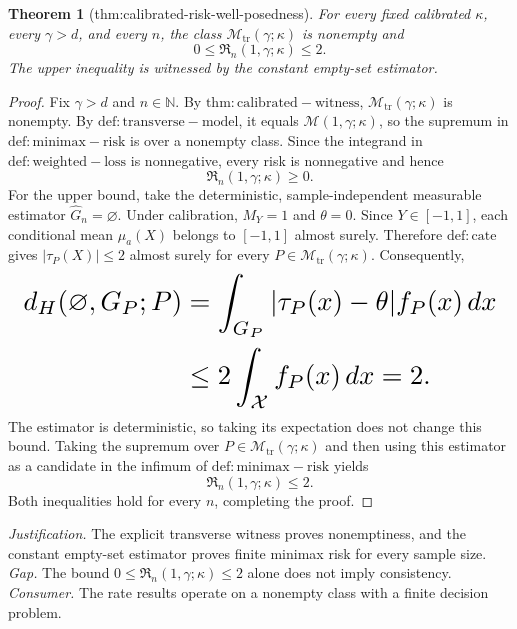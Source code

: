 \documentclass{article}
\newtheorem{theorem}{Theorem}
\begin{document}
\begin{theorem}[thm:calibrated-risk-well-posedness]\label{thm:calibrated-risk-well-posedness}
For every fixed calibrated \(\kappa\), every \(\gamma>d\), and every \(n\), the class \(\mathcal M_{\mathrm{tr}}(\gamma;\kappa)\) is nonempty and
\[
0\le\mathfrak R_n(1,\gamma;\kappa)\le2.
\]
The upper inequality is witnessed by the constant empty-set estimator.
\end{theorem}
\begin{proof}
Fix \(\gamma>d\) and \(n\in\mathbb N\). By \(\mathrm{thm:calibrated-witness}\), \(\mathcal M_{\mathrm{tr}}(\gamma;\kappa)\) is nonempty. By \(\mathrm{def:transverse-model}\), it equals \(\mathcal M(1,\gamma;\kappa)\), so the supremum in \(\mathrm{def:minimax-risk}\) is over a nonempty class. Since the integrand in \(\mathrm{def:weighted-loss}\) is nonnegative, every risk is nonnegative and hence
\[
\mathfrak R_n(1,\gamma;\kappa)\ge0.
\]
For the upper bound, take the deterministic, sample-independent measurable estimator \(\widehat G_n=\varnothing\). Under calibration, \(M_Y=1\) and \(\theta=0\). Since \(Y\in[-1,1]\), each conditional mean \(\mu_a(X)\) belongs to \([-1,1]\) almost surely. Therefore \(\mathrm{def:cate}\) gives \(|\tau_P(X)|\le2\) almost surely for every \(P\in\mathcal M_{\mathrm{tr}}(\gamma;\kappa)\). Consequently,
\[
\makebox[\linewidth][c]{\resizebox{0.98\linewidth}{!}{\(\displaystyle \begin{aligned}
d_H(\varnothing,G_P;P)
&=\int_{G_P}|\tau_P(x)-\theta|f_P(x)\,dx\\
&\le2\int_{\mathcal X}f_P(x)\,dx
=2.
\end{aligned}\)}}
\]
The estimator is deterministic, so taking its expectation does not change this bound. Taking the supremum over \(P\in\mathcal M_{\mathrm{tr}}(\gamma;\kappa)\) and then using this estimator as a candidate in the infimum of \(\mathrm{def:minimax-risk}\) yields
\[
\mathfrak R_n(1,\gamma;\kappa)\le2.
\]
Both inequalities hold for every \(n\), completing the proof.
\end{proof}
\par\smallskip\noindent \textit{Justification.} The explicit transverse witness proves nonemptiness, and the constant empty-set estimator proves finite minimax risk for every sample size. \textit{Gap.} The bound \(0\le\mathfrak R_n(1,\gamma;\kappa)\le2\) alone does not imply consistency. \textit{Consumer.} The rate results operate on a nonempty class with a finite decision problem.
\end{document}

